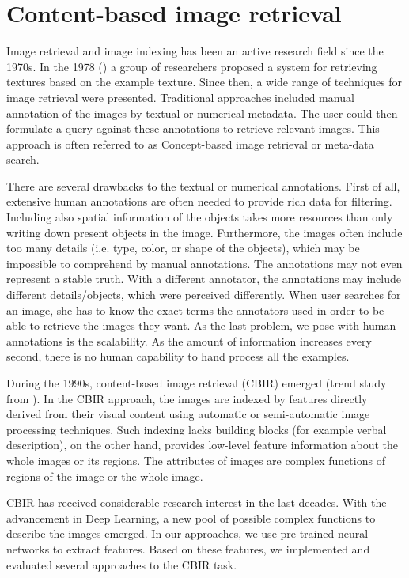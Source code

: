 \chapter{Content-based image retrieval}
\label{ch:content_based}

Image retrieval and image indexing has been an active research field since the 1970s. In the 1978 (\cite{tamura1978textural}) a group of researchers proposed a system for retrieving textures based on the example texture. Since then, a wide range of techniques for image retrieval were presented. Traditional approaches included manual annotation of the images by textual or numerical metadata. The user could then formulate a query against these annotations to retrieve relevant images. This approach is often referred to as Concept-based image retrieval or meta-data search.

There are several drawbacks to the textual or numerical annotations. First of all, extensive human annotations are often needed to provide rich data for filtering. Including also spatial information of the objects takes more resources than only writing down present objects in the image. Furthermore, the images often include too many details (i.e. type, color, or shape of the objects), which may be impossible to comprehend by manual annotations.  The annotations may not even represent a stable truth. With a different annotator, the annotations may include different details/objects, which were perceived differently. When user searches for an image, she has to know the exact terms the annotators used in order to be able to retrieve the images they want. As the last problem, we pose with human annotations is the scalability. As the amount of information increases every second, there is no human capability to hand process all the examples.

During the 1990s, content-based image retrieval (CBIR) emerged (trend study from \cite{datta2008image}). In the CBIR approach, the images are indexed by features directly derived from their visual content using automatic or semi-automatic image processing techniques. Such indexing lacks building blocks (for example verbal description), on the other hand, provides low-level feature information about the whole images or its regions. The attributes of images are complex functions of regions of the image or the whole image.

CBIR has received considerable research interest in the last decades. With the advancement in Deep Learning, a new pool of possible complex functions to describe the images emerged. In our approaches, we use pre-trained neural networks to extract features. Based on these features, we implemented and evaluated several approaches to the CBIR task.

